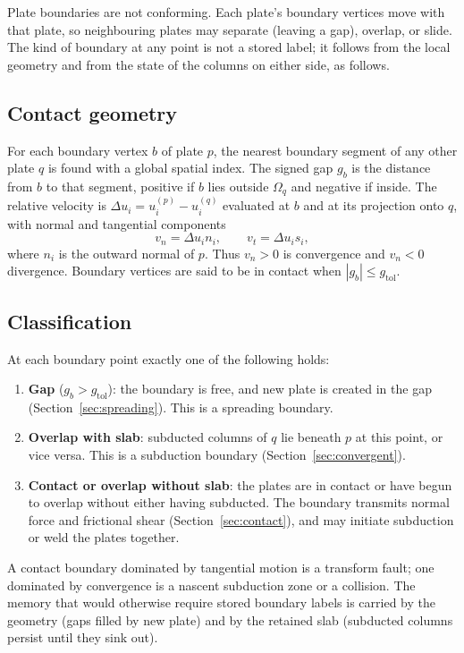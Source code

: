 \documentclass[11pt]{article}
\begin{document}
Plate boundaries are not conforming. Each plate's boundary vertices move with
that plate, so neighbouring plates may separate (leaving a gap), overlap, or
slide. The kind of boundary at any point is not a stored label; it follows from
the local geometry and from the state of the columns on either side, as follows.

\subsection{Contact geometry}

For each boundary vertex $b$ of plate $p$, the nearest boundary segment of any
other plate $q$ is found with a global spatial index. The signed gap $g_b$ is
the distance from $b$ to that segment, positive if $b$ lies outside $\Omega_q$
and negative if inside. The relative velocity is
$\Delta u_i = u_i^{(p)} - u_i^{(q)}$ evaluated at $b$ and at its projection onto
$q$, with normal and tangential components
\begin{equation}
  v_n = \Delta u_i n_i, \qquad v_t = \Delta u_i s_i,
\end{equation}
where $n_i$ is the outward normal of $p$. Thus $v_n > 0$ is convergence and
$v_n < 0$ divergence. Boundary vertices are said to be in contact when
$|g_b| \le g_{\mathrm{tol}}$.

\subsection{Classification}
\label{sec:classification}

At each boundary point exactly one of the following holds:
\begin{enumerate}
  \item \textbf{Gap} ($g_b > g_{\mathrm{tol}}$): the boundary is free, and new
        plate is created in the gap (Section~\ref{sec:spreading}). This is a
        spreading boundary.
  \item \textbf{Overlap with slab}: subducted columns of $q$ lie beneath $p$ at
        this point, or vice versa. This is a subduction boundary
        (Section~\ref{sec:convergent}).
  \item \textbf{Contact or overlap without slab}: the plates are in contact or
        have begun to overlap without either having subducted. The boundary
        transmits normal force and frictional shear
        (Section~\ref{sec:contact}), and may initiate subduction or weld the
        plates together.
\end{enumerate}
A contact boundary dominated by tangential motion is a transform fault; one
dominated by convergence is a nascent subduction zone or a collision. The memory
that would otherwise require stored boundary labels is carried by the geometry
(gaps filled by new plate) and by the retained slab (subducted columns persist
until they sink out).
\end{document}
